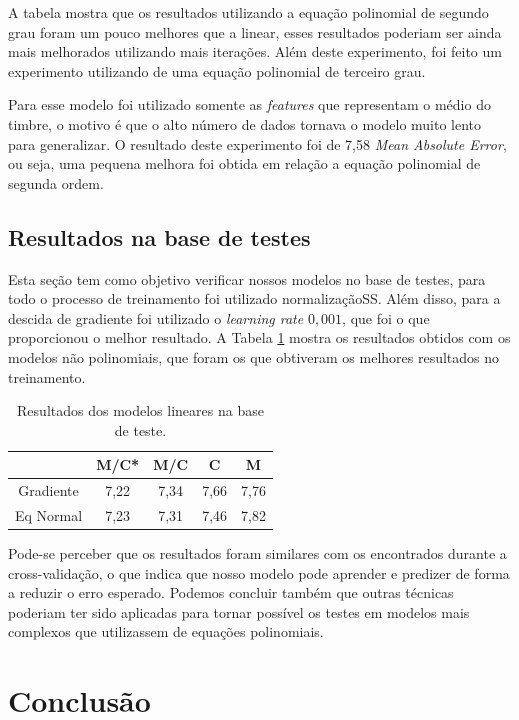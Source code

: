 \documentclass[conference]{IEEEtran}
\begin{document}
A tabela mostra que os resultados utilizando a equação polinomial de segundo grau foram um pouco melhores que a linear, esses resultados poderiam ser ainda mais melhorados utilizando mais iterações. Além deste experimento, foi feito um experimento utilizando de uma equação polinomial de terceiro grau.

Para esse modelo foi utilizado somente as \emph{features} que representam o médio do timbre, o motivo é que o alto número de dados tornava o modelo muito lento para generalizar. O resultado deste experimento foi de 7,58 \emph{Mean Absolute Error}, ou seja, uma pequena melhora foi obtida em relação a equação polinomial de segunda ordem.


\subsection{Resultados na base de testes }

Esta seção tem como objetivo verificar nossos modelos no base de testes, para todo o processo de treinamento foi utilizado normalizaçãoSS. Além disso, para a descida de gradiente foi utilizado o \emph{learning rate} $0,001$, que foi o que proporcionou o melhor resultado. A Tabela \ref{tab:result} mostra os resultados obtidos com os modelos não polinomiais, que foram os que obtiveram os melhores resultados no treinamento.


\begin{table}[!h]
	\centering

	\begin{tabular}{ccccc}
		\hline
		& \textbf{M/C*} & \textbf{M/C} & \textbf{C} & \textbf{M} \\ \hline
		Gradiente & 7,22          & 7,34         & 7,66       & 7,76       \\
		Eq Normal & 7,23          & 7,31         & 7,46       & 7,82       \\ \hline
	\end{tabular}
	\caption{Resultados dos modelos lineares na base de teste.}
	\label{tab:result}
\end{table}

Pode-se perceber que os resultados foram similares com os encontrados durante a cross-validação, o que indica que nosso modelo pode aprender e predizer de forma a reduzir o erro esperado. Podemos concluir também que outras técnicas poderiam ter sido aplicadas para tornar possível os testes em modelos mais complexos que utilizassem de equações polinomiais.


\section{Conclusão} \label{sec:conc}
\end{document}
